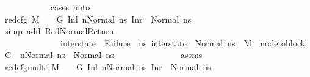 \begin{isabellebody}
\ \ \ \ \ \ \ \ \ \ \isamarkupfalse%
\ {\isacharparenleft}{\kern0pt}cases{\isacharparenright}{\kern0pt}\ auto\isanewline
\isanewline
\ \ \ \ \ \ \ \ \isamarkupfalse%
\ {\isachardoublequoteopen}{\isacharparenleft}{\kern0pt}red{\isacharunderscore}{\kern0pt}cfg\ M\ {\isasymLambda}\ {\isasymGamma}\ {\isasymOmega}\ G\ {\isacharparenleft}{\kern0pt}{\isacharparenleft}{\kern0pt}Inl\ n{\isacharparenright}{\kern0pt}{\isacharcomma}{\kern0pt}{\isacharparenleft}{\kern0pt}Normal\ ns{}{\isacharparenright}{\kern0pt}{\isacharparenright}{\kern0pt}\ {\isacharparenleft}{\kern0pt}Inr\ {\isacharparenleft}{\kern0pt}{\isacharparenright}{\kern0pt}{\isacharcomma}{\kern0pt}\ Normal\ ns{}{\isacharparenright}{\kern0pt}{\isacharparenright}{\kern0pt}{\isachardoublequoteclose}\isanewline
\ \ \ \ \ \ \ \ \ \ \isamarkupfalse%
\ {\isacharparenleft}{\kern0pt}simp\ add{\isacharcolon}{\kern0pt}\ RedNormalReturn\ \isanewline
\ \ \ \ \ \ \ \ \ \ \ \ \ \ {\isacartoucheopen}inter{\isacharunderscore}{\kern0pt}state\ {\isasymnoteq}\ Failure\ {\isasymand}\ {\isacharparenleft}{\kern0pt}{\isasymforall}ns{}{\isacharprime}{\kern0pt}{\isachardot}{\kern0pt}\ inter{\isacharunderscore}{\kern0pt}state\ {\isacharequal}{\kern0pt}\ Normal\ ns{}{\isacharprime}{\kern0pt}\ {\isasymlongrightarrow}\ M{\isacharcomma}{\kern0pt}{\isasymLambda}{\isacharcomma}{\kern0pt}{\isasymGamma}{\isacharcomma}{\kern0pt}{\isasymOmega}\ {\isasymturnstile}\ {\isasymlangle}node{\isacharunderscore}{\kern0pt}to{\isacharunderscore}{\kern0pt}block\ G\ {\isacharbang}{\kern0pt}\ n{\isacharcomma}{\kern0pt}Normal\ ns{}{\isasymrangle}\ {\isacharbrackleft}{\kern0pt}{\isasymrightarrow}{\isacharbrackright}{\kern0pt}\ Normal\ ns{}{\isacharprime}{\kern0pt}{\isacharparenright}{\kern0pt}{\isacartoucheclose}\ \isanewline
\ \ \ \ \ \ \ \ \ \ \ \ \ \ assms{\isacharparenleft}{\kern0pt}{}{\isacharparenright}{\kern0pt}{\isacharparenright}{\kern0pt}\isanewline
\isanewline
\ \ \ \ \ \ \ \ \isamarkupfalse%
\ {\isachardoublequoteopen}{\isacharparenleft}{\kern0pt}red{\isacharunderscore}{\kern0pt}cfg{\isacharunderscore}{\kern0pt}multi\ M\ {\isasymLambda}\ {\isasymGamma}\ {\isasymOmega}\ G\ {\isacharparenleft}{\kern0pt}{\isacharparenleft}{\kern0pt}Inl\ n{\isacharparenright}{\kern0pt}{\isacharcomma}{\kern0pt}{\isacharparenleft}{\kern0pt}Normal\ ns{}{\isacharparenright}{\kern0pt}{\isacharparenright}{\kern0pt}\ {\isacharparenleft}{\kern0pt}Inr\ {\isacharparenleft}{\kern0pt}{\isacharparenright}{\kern0pt}{\isacharcomma}{\kern0pt}\ Normal\ ns{}{\isacharparenright}{\kern0pt}{\isacharparenright}{\kern0pt}{\isachardoublequoteclose}\ \isamarkupfalse%

\end{isabellebody}
